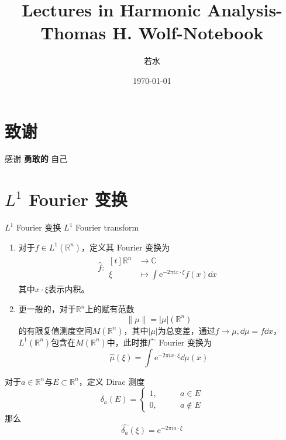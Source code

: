 \documentclass[lang = cn, %
scheme = chinese          %
]
{elegantbook}             %
\title{Lectures in Harmonic Analysis-Thomas H. Wolf-Notebook}                %
\author{若水}               %
\date{\today}               %
\newcommand{\R}{\mathbb{R}}            %
\newcommand{\C}{\mathbb{C}}  		   %
\newcommand{\sub}{\subset}             %
\newcommand{\ee}[1]{\mathrm{e}^{#1}}           %
\begin{document}
\maketitle       %

\frontmatter     %

\chapter*{致谢}


\vspace*{\fill}
	\begin{center}
		
		\large{感谢 \textbf{ 勇敢的 } 自己}
		
	\end{center}
\vspace*{\fill}

\tableofcontents %

\mainmatter      %

\chapter{$L^1$ Fourier 变换}

\begin{definition}{$L^1$ Fourier 变换 $L^1$ Fourier transform}
	\begin{enumerate}
		\item 对于$f\in L^1(\R^n)$，定义其 Fourier 变换为
		\begin{align*}
			\widehat{f}:\begin{aligned}[t]
				\R^n &\longrightarrow \C\\
				\xi &\longmapsto \int\ee{-2\pi i x \cdot \xi}f(x)\dd x
			\end{aligned}
		\end{align*}
		其中$x \cdot \xi$表示内积。
		\item 更一般的，对于$\R^n$上的赋有范数
		\[
		\|\mu\|=|\mu|(\R^n)
		\]
		的有限复值测度空间$M(\R^n)$，其中$|\mu|$为总变差，通过$f\to\mu,\dd\mu=f\dd x$，$L^1(\R^n)$包含在$M(\R^n)$中，此时推广 Fourier 变换为
		\[
		\widehat{\mu}(\xi)=\int\ee{-2\pi i x \cdot \xi}\dd\mu(x)
		\]
	\end{enumerate}
\end{definition}

\begin{example}
	对于$a\in\R^n$与$E\sub\R^n$，定义 Dirac 测度
	\[
	\delta_a(E)=\begin{cases}
		1,\qquad & a\in E\\
		0,\qquad & a\notin E
	\end{cases}
	\]
	那么
	\[
	\widehat{\delta_a}(\xi)=\ee{-2\pi i a\cdot \xi}
	\]
\end{example}
\end{document}
